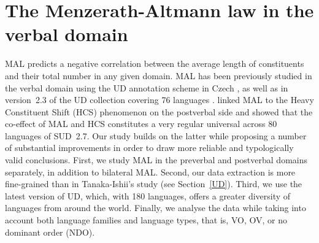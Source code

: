 \section{The Menzerath-Altmann law in the verbal domain}\label{MAL}
MAL predicts a negative correlation between the average length of constituents and their total number in any given domain. MAL has been previously studied in the verbal domain using the UD annotation scheme in Czech \citep{macutek2017menzerath}, as well as in version~2.3 of the UD collection covering 76 languages \citep{tanaka2021menzerath}. \citet{chen2022co} linked MAL to the Heavy Constituent Shift (HCS) phenomenon on the postverbal side and showed that the co-effect of MAL and HCS constitutes a very regular universal across 80 languages of SUD~2.7.  
Our study builds on the latter while proposing a number of substantial improvements in order to draw more reliable and typologically valid conclusions. First, we study MAL in the preverbal and postverbal domains separately, in addition to bilateral MAL. Second, our data extraction is more fine-grained than in Tanaka-Ishii's study (see Section~\ref{UD}). Third, we use the latest version of UD, which, with 180 languages, offers a greater diversity of languages from around the world. Finally, we analyse the data while taking into account both language families and language types, that is, VO, OV, or no dominant order (NDO).


